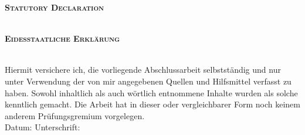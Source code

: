 
\begin{center}
\large \textsc{\textbf{Statutory Declaration}} \\
~\\ %



\end{center}

\vfill %
\begin{center}
\large \textsc{ \textbf{Eidesstaatliche Erkl\"arung} } \\
~\\ %
\end{center}

 Hiermit versichere ich, die vorliegende Abschlussarbeit selbstständig und nur unter Verwendung der von mir angegebenen Quellen und Hilfsmittel verfasst zu haben. Sowohl inhaltlich als auch wörtlich entnommene Inhalte wurden als solche kenntlich gemacht. Die Arbeit hat in dieser oder vergleichbarer Form noch keinem anderem Prüfungsgremium vorgelegen. 
\\[1.5cm]
Datum:	\hrulefill\enspace Unterschrift: \hrulefill
\\[3.5cm]